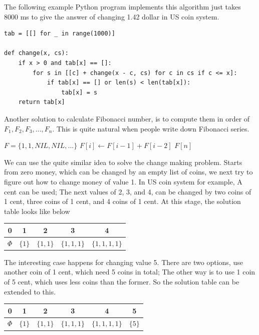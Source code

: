 \documentclass[UTF8]{article}
\begin{document}
The following example Python program implements this algorithm just takes 8000 ms
to give the answer of changing 1.42 dollar in US coin system.

\lstset{language=Python}
\begin{lstlisting}
tab = [[] for _ in range(1000)]

def change(x, cs):
    if x > 0 and tab[x] == []:
        for s in [[c] + change(x - c, cs) for c in cs if c <= x]:
            if tab[x] == [] or len(s) < len(tab[x]):
                tab[x] = s
    return tab[x]
\end{lstlisting}

Another solution to calculate Fibonacci number, is to compute them in order
of $F_1, F_2, F_3, ..., F_n$. This is quite natural when people write down
Fibonacci series.

\begin{algorithmic}[1]
  \State $F = \{1, 1, NIL, NIL, ...\}$
    \State $F[i] \gets F[i-1] + F[i-2]$
  \EndFor
  \State \Return $F[n]$
\EndFunction
\end{algorithmic}

We can use the quite similar idea to solve the change making problem.
Starts from zero money, which can be changed by an empty list of coins, we next
try to figure out how to change money of value 1. In US coin system for example,
A cent can be used; The next values of 2, 3, and 4, can be changed by
two coins of 1 cent, three coins of 1 cent, and 4 coins of 1 cent.
At this stage, the solution table looks like below

\begin{tabular}{|c|c|c|c|c|}
\hline
0 & 1 & 2 & 3 & 4 \\
\hline
$\Phi$ & $\{1\}$ & $\{1, 1\}$ & $\{1, 1, 1\}$ & $\{1, 1, 1, 1\}$ \\
\hline
\end{tabular}

The interesting case happens for changing value 5. There are two options,
use another coin of 1 cent, which need 5 coins in total; The other way
is to use 1 coin of 5 cent, which uses less coins than the former.
So the solution table can be extended to this.

\begin{tabular}{|c|c|c|c|c|c|}
\hline
0 & 1 & 2 & 3 & 4 & 5 \\
\hline
$\Phi$ & $\{1\}$ & $\{1, 1\}$ & $\{1, 1, 1\}$ & $\{1, 1, 1, 1\}$ & $\{ 5 \}$ \\
\hline
\end{tabular}
\end{document}

